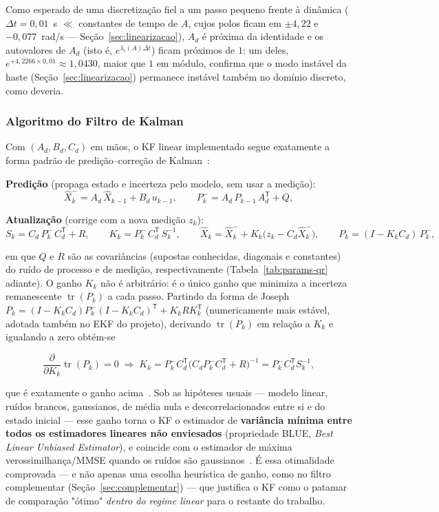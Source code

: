 \documentclass[brazil, 12pt]{article}
\begin{document}
Como esperado de uma discretização fiel a um passo pequeno frente à dinâmica
($\Delta t=0{,}01$~s $\ll$ constantes de tempo de $A$, cujos polos ficam em
$\pm4{,}22$ e $-0{,}077$~rad/s — Seção~\ref{sec:linearizacao}), $A_d$ é próxima
da identidade e os autovalores de $A_d$ (isto é, $e^{\lambda_i(A)\Delta t}$)
ficam próximos de $1$: um deles, $e^{+4{,}2266\times0{,}01}\approx1{,}0430$,
maior que $1$ em módulo, confirma que o modo instável da haste
(Seção~\ref{sec:linearizacao}) permanece instável também no domínio discreto,
como deveria.

\subsubsection{Algoritmo do Filtro de Kalman}
\label{sec:kf-algoritmo}

Com $(A_d,B_d,C_d)$ em mãos, o KF linear implementado segue exatamente a forma
padrão de predição--correção de Kalman~\cite{welch1995, simon2006}:

\medskip
\noindent\textbf{Predição} (propaga estado e incerteza pelo modelo, sem usar a medição):
\[
\hat X_{k}^{-} = A_d\,\hat X_{k-1} + B_d\,u_{k-1},
\qquad
P_{k}^{-} = A_d\,P_{k-1}\,A_d^{\mathsf T} + Q,
\]

\noindent\textbf{Atualização} (corrige com a nova medição $z_k$):
\[
S_k = C_d\,P_k^{-}\,C_d^{\mathsf T} + R,
\qquad
K_k = P_k^{-}\,C_d^{\mathsf T}\,S_k^{-1},
\qquad
\hat X_k = \hat X_k^{-} + K_k\big(z_k - C_d\hat X_k^{-}\big),
\qquad
P_k = (I - K_k C_d)\,P_k^{-},
\]

em que $Q$ e $R$ são as covariâncias (supostas conhecidas, diagonais e
constantes) do ruído de processo e de medição, respectivamente
(Tabela~\ref{tab:params-qr} adiante). O ganho $K_k$ não é arbitrário: é o único
ganho que minimiza a incerteza remanescente $\operatorname{tr}(P_k)$ a cada
passo. Partindo da forma de Joseph
$P_k=(I-K_kC_d)P_k^{-}(I-K_kC_d)^{\mathsf T}+K_kRK_k^{\mathsf T}$ (numericamente
mais estável, adotada também no EKF do projeto), derivando
$\operatorname{tr}(P_k)$ em relação a $K_k$ e igualando a zero obtém-se

\[
\frac{\partial}{\partial K_k}\operatorname{tr}(P_k) = 0
\;\Longrightarrow\;
K_k = P_k^{-}C_d^{\mathsf T}\big(C_dP_k^{-}C_d^{\mathsf T}+R\big)^{-1} = P_k^{-}C_d^{\mathsf T}S_k^{-1},
\]

que é exatamente o ganho acima~\cite{simon2006}. Sob as hipóteses
usuais — modelo linear, ruídos brancos, gaussianos, de média nula e
descorrelacionados entre si e do estado inicial — esse ganho torna o KF o
estimador de \textbf{variância mínima entre todos os estimadores lineares não
enviesados} (propriedade BLUE, \emph{Best Linear Unbiased Estimator}), e
coincide com o estimador de máxima verossimilhança/MMSE quando os ruídos são
gaussianos~\cite{simon2006}. É essa otimalidade
comprovada — e não apenas uma escolha heurística de ganho, como no filtro
complementar (Seção~\ref{sec:complementar}) — que justifica o KF como o
patamar de comparação "ótimo" \emph{dentro do regime linear} para o restante do
trabalho.
\end{document}
